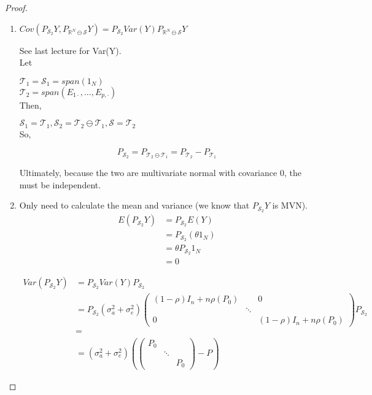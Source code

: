 \documentclass[11pt,fleqn]{book} %
\begin{document}
\begin{proof}
	\begin{enumerate}
		\item $Cov(P_{\mathcal{S}_2} Y, P_{\mathbb{R}^N \ominus \mathcal{S}} Y) = P_{\mathcal{S}_2} Var(Y) P_{\mathbb{R}^N \ominus \mathcal{S}} Y$ 

		See last lecture for Var(Y).\\

		Let

		$\mathcal{T}_1 = \mathcal{S}_1 = span(1_N)$\\
		$\mathcal{T}_2 = span(E_{1\cdot}, \dots, E_{p, \cdot})$\\

		Then, 

		$\mathcal{S}_1 = \mathcal{T}_1, \mathcal{S}_2 = \mathcal{T}_2 \ominus \mathcal{T}_1, \mathcal{S} = \mathcal{T}_2$\\

		So, 

				$$P_{\mathcal{S}_2} = P_{\mathcal{T}_2 \ominus \mathcal{T}_1} = P_{\mathcal{T}_2} - P_{\mathcal{T}_1} $$


		Ultimately, because the two are multivariate normal with covariance 0, the must be independent. \\

		\item Only need to calculate the mean and variance (we know that $P_{\mathcal{S}_2} Y$ is MVN). \\


		\begin{align*}
			E(P_{\mathcal{S}_2} Y) &= P_{\mathcal{S}_2} E( Y)\\
				&=  P_{\mathcal{S}_2} (\theta 1_N)\\
				&= \theta P_{\mathcal{S}_2} 1_N\\
				&= 0
		\end{align*}

		\begin{align*}
			Var(P_{\mathcal{S}_2} Y) &= P_{\mathcal{S}_2} Var( Y) P_{\mathcal{S}_2} \\
				&=  P_{\mathcal{S}_2} (\sigma^2_a + \sigma^2_e) \begin{pmatrix}
			(1 - \rho)I_n + n\rho(P_0) & & 0\\
				& \ddots & \\
			0 & & (1 - \rho)I_n + n\rho(P_0)
		\end{pmatrix}P_{\mathcal{S}_2}\\
				&= \\
				&= (\sigma^2_a + \sigma^2_e)(\begin{pmatrix}
				P_0 & & \\
				 & \ddots & \\
				 & & P_0
			\end{pmatrix} -P)
		\end{align*}


\end{enumerate}
\end{proof}
\end{document}
